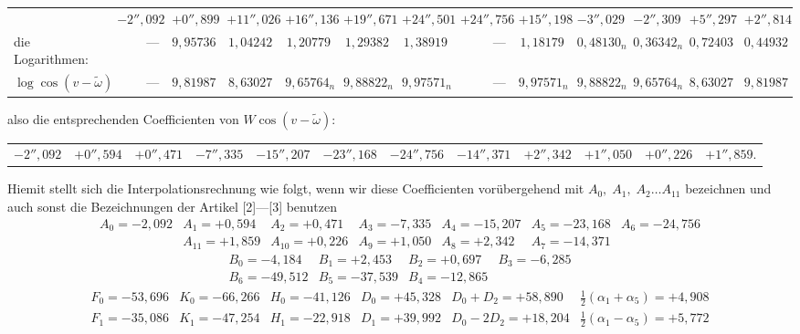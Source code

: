 \begin{landscape}
\begin{center}
\begin{tabular}{@{}l*{12}{r}@{}}
&\(-2''{,}092\)&\(+0''{,}899\)&\(+11''{,}026\)&\(+16''{,}136\)&\(+19''{,}671\)&\(+24''{,}501\)&\(+24''{,}756\)&\(+15''{,}198\)&\(-3''{,}029\)&\(-2''{,}309\)&\(+5''{,}297\)&\(+2''{,}814\)\\[4pt]
die Logarithmen:&\(\text{—}\)&\(9{,}95736\)&\(1{,}04242\)&\(1{,}20779\)&\(1{,}29382\)&\(1{,}38919\)&\(\text{—}\)&\(1{,}18179\)&\(0{,}48130_n\)&\(0{,}36342_n\)&\(0{,}72403\)&\(0{,}44932\)\\[4pt]
\(\log\cos(v-\tilde\omega)\)&\(\text{—}\)&\(9{,}81987\)&\(8{,}63027\)&\(9{,}65764_n\)&\(9{,}88822_n\)&\(9{,}97571_n\)&\(\text{—}\)&\(9{,}97571_n\)&\(9{,}88822_n\)&\(9{,}65764_n\)&\(8{,}63027\)&\(9{,}81987\)
\end{tabular}
\endgroup
\end{center}
\noindent also die entsprechenden Coefficienten von \(W\cos(v-\tilde\omega)\):
\begin{center}
\begingroup\fontsize{9}{12}\selectfont\setlength{\tabcolsep}{4pt}
\begin{tabular}{@{}*{12}{r}@{}}
\(-2''{,}092\)&\(+0''{,}594\)&\(+0''{,}471\)&\(-7''{,}335\)&\(-15''{,}207\)&\(-23''{,}168\)&\(-24''{,}756\)&\(-14''{,}371\)&\(+2''{,}342\)&\(+1''{,}050\)&\(+0''{,}226\)&\(+1''{,}859\).
\end{tabular}
\endgroup
\end{center}
\par\noindent\hspace*{\parindent}Hiemit stellt sich die Interpolationsrechnung wie folgt, wenn wir diese Coefficienten vorübergehend mit \(A_0,\;A_1,\;A_2\ldots A_{11}\) bezeichnen und auch sonst die Bezeichnungen der Artikel [2]—[3] benutzen
\[
\begin{array}{rrrrrrr}
A_0=-2{,}092&A_1=+0{,}594&A_2=+0{,}471&A_3=-7{,}335&A_4=-15{,}207&A_5=-23{,}168&A_6=-24{,}756\\
&A_{11}=+1{,}859&A_{10}=+0{,}226&A_9=+1{,}050&A_8=+2{,}342&A_7=-14{,}371&
\end{array}
\]
\[
\begin{array}{rrrr}
B_0=-4{,}184&B_1=+2{,}453&B_2=+0{,}697&B_3=-6{,}285\\
B_6=-49{,}512&B_5=-37{,}539&B_4=-12{,}865&
\end{array}
\]
\[
\begin{array}{rrrrrr}
F_0=-53{,}696&K_0=-66{,}266&H_0=-41{,}126&D_0=+45{,}328&D_0+D_2=+58{,}890&\frac12(\alpha_1+\alpha_5)=+4{,}908\\
F_1=-35{,}086&K_1=-47{,}254&H_1=-22{,}918&D_1=+39{,}992&D_0-2D_2=+18{,}204&\frac12(\alpha_1-\alpha_5)=+5{,}772\\

\end{array}\]
\end{landscape}
